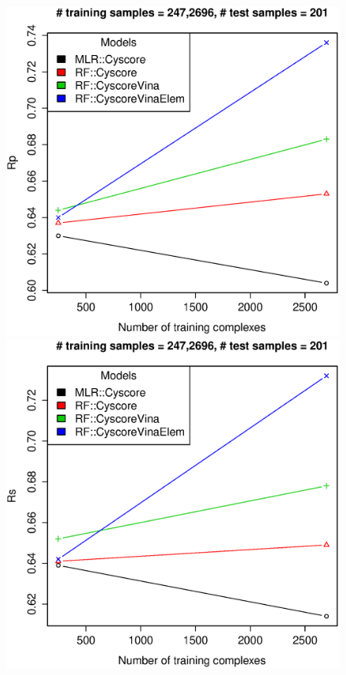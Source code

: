 \documentclass[journal=jacsat,manuscript=article]{achemso}
\begin{document}
\begin{figure}[ht!]
\endminipage
{}
\includegraphics[width=\linewidth]{../rfcyscore/tst-201-pcor.eps}
\endminipage
{}
\includegraphics[width=\linewidth]{../rfcyscore/tst-201-scor.eps}

\end{figure}
\end{document}

